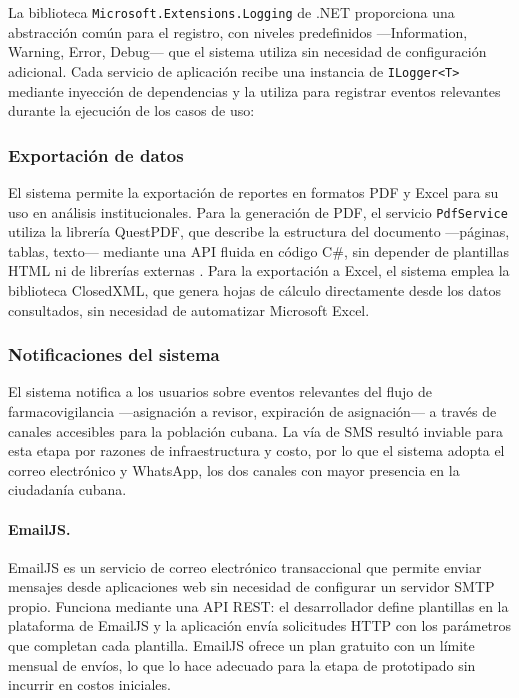 La biblioteca \texttt{Microsoft.Extensions.Logging} de .NET proporciona una abstracción común para el registro, con niveles predefinidos —Information, Warning, Error, Debug— que el sistema utiliza sin necesidad de configuración adicional. Cada servicio de aplicación recibe una instancia de \texttt{ILogger<T>} mediante inyección de dependencias y la utiliza para registrar eventos relevantes durante la ejecución de los casos de uso:


\subsubsection{Exportación de datos}

El sistema permite la exportación de reportes en formatos PDF y Excel para su uso en análisis institucionales. Para la generación de PDF, el servicio \texttt{PdfService} utiliza la librería QuestPDF, que describe la estructura del documento —páginas, tablas, texto— mediante una API fluida en código C\#, sin depender de plantillas HTML ni de librerías externas \cite{questpdf}. Para la exportación a Excel, el sistema emplea la biblioteca ClosedXML, que genera hojas de cálculo directamente desde los datos consultados, sin necesidad de automatizar Microsoft Excel.

\subsubsection{Notificaciones del sistema}

El sistema notifica a los usuarios sobre eventos relevantes del flujo de farmacovigilancia —asignación a revisor, expiración de asignación— a través de canales accesibles para la población cubana. 
La vía de SMS resultó inviable para esta etapa por razones de infraestructura y costo, por lo que el sistema adopta el correo electrónico y WhatsApp, los dos canales con mayor presencia en la ciudadanía cubana.

\paragraph{EmailJS.}

EmailJS es un servicio de correo electrónico transaccional que permite enviar mensajes desde aplicaciones web sin necesidad de configurar un servidor SMTP propio. 
Funciona mediante una API REST: el desarrollador define plantillas en la plataforma de EmailJS y la aplicación envía solicitudes HTTP con los parámetros que completan cada plantilla. 
EmailJS ofrece un plan gratuito con un límite mensual de envíos, lo que lo hace adecuado para la etapa de prototipado sin incurrir en costos iniciales. 

